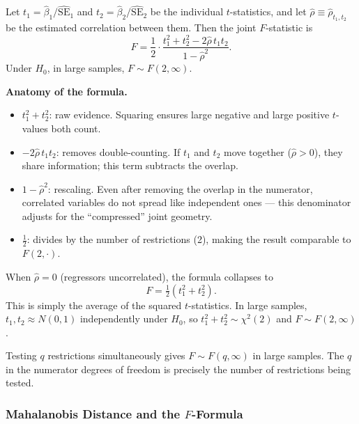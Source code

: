 \begin{theorem}
Let $t_1 = \hat\beta_1 / \widehat{\mathrm{SE}}_1$ and $t_2 = \hat\beta_2 / \widehat{\mathrm{SE}}_2$ be the individual $t$-statistics, and let $\hat\rho \equiv \hat\rho_{t_1,t_2}$ be the estimated correlation between them. Then the joint $F$-statistic is
\[
F = \frac{1}{2} \cdot \frac{t_1^2 + t_2^2 - 2\hat\rho\, t_1 t_2}{1 - \hat\rho^2}.
\]
Under $H_0$, in large samples, $F \sim F(2,\infty)$.
\end{theorem}

\textbf{Anatomy of the formula.}
\begin{itemize}
    \item $t_1^2 + t_2^2$: raw evidence. Squaring ensures large negative and large positive $t$-values both count.
    \item $-2\hat\rho\, t_1 t_2$: removes double-counting. If $t_1$ and $t_2$ move together ($\hat\rho > 0$), they share information; this term subtracts the overlap.
    \item $1 - \hat\rho^2$: rescaling. Even after removing the overlap in the numerator, correlated variables do not spread like independent ones — this denominator adjusts for the ``compressed'' joint geometry.
    \item $\frac{1}{2}$: divides by the number of restrictions (2), making the result comparable to $F(2,\cdot)$.
\end{itemize}

\begin{remark}
When $\hat\rho = 0$ (regressors uncorrelated), the formula collapses to
\[
F = \tfrac{1}{2}(t_1^2 + t_2^2).
\]
This is simply the average of the squared $t$-statistics. In large samples, $t_1, t_2 \approx N(0,1)$ independently under $H_0$, so $t_1^2 + t_2^2 \sim \chi^2(2)$ and $F \sim F(2,\infty)$.
\end{remark}

\begin{remark}
Testing $q$ restrictions simultaneously gives $F \sim F(q,\infty)$ in large samples. The $q$ in the numerator degrees of freedom is precisely the number of restrictions being tested.
\end{remark}

\subsubsection*{Mahalanobis Distance and the $F$-Formula}

